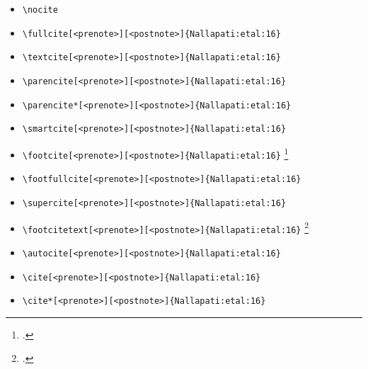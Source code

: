 \begin{itemize}
\item \verb=\nocite= \nocite{Bech:63}
\item \verb=\fullcite[<prenote>][<postnote>]{Nallapati:etal:16}= \newline  {}
\item \verb=\textcite[<prenote>][<postnote>]{Nallapati:etal:16}= \newline \textcite[<prenote>][<postnote>]{Nallapati:etal:16}
\item \verb=\parencite[<prenote>][<postnote>]{Nallapati:etal:16}= \newline \parencite[<prenote>][<postnote>]{Nallapati:etal:16}
\item \verb=\parencite*[<prenote>][<postnote>]{Nallapati:etal:16}= \newline \parencite*[<prenote>][<postnote>]{Nallapati:etal:16}
\item \verb=\smartcite[<prenote>][<postnote>]{Nallapati:etal:16}= \newline \smartcite[<prenote>][<postnote>]{Nallapati:etal:16}
\item \verb=\footcite[<prenote>][<postnote>]{Nallapati:etal:16}= \newline \footcite[<prenote>][<postnote>]{Nallapati:etal:16}
\item \verb=\footfullcite[<prenote>][<postnote>]{Nallapati:etal:16}= \newline  {}
\item \verb=\supercite[<prenote>][<postnote>]{Nallapati:etal:16}= \newline \supercite[<prenote>][<postnote>]{Nallapati:etal:16}
\item \verb=\footcitetext[<prenote>][<postnote>]{Nallapati:etal:16}= \newline \footcitetext[<prenote>][<postnote>]{Nallapati:etal:16}
\item \verb=\autocite[<prenote>][<postnote>]{Nallapati:etal:16}= \newline  \autocite[<prenote>][<postnote>]{Nallapati:etal:16}
\item \verb=\cite[<prenote>][<postnote>]{Nallapati:etal:16}= \newline  \cite[<prenote>][<postnote>]{Nallapati:etal:16}
\item \verb=\cite*[<prenote>][<postnote>]{Nallapati:etal:16}= \newline  \cite*[<prenote>][<postnote>]{Nallapati:etal:16}

\end{itemize}
